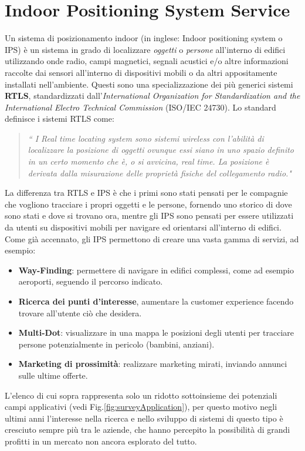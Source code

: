 \section{Indoor Positioning System Service}
\label{IPS}
Un sistema di posizionamento indoor (in inglese: Indoor positioning system o IPS) è un sistema in grado di localizzare \textit{oggetti} o \textit{persone} all'interno di edifici utilizzando onde radio, campi magnetici, segnali acustici e/o altre informazioni raccolte dai sensori all'interno di dispositivi mobili \cite{IPS} o da altri  appositamente installati nell'ambiente. Questi sono una specializzazione dei più generici sistemi \textbf{RTLS}, standardizzati dall'\textit{International
Organization for Standardization and the International Electro Technical Commission} (ISO/IEC 24730). Lo standard definisce i sistemi RTLS come:
\begin{quotation}
	\textit{“ I Real time locating system sono sistemi wireless con l'abilità di localizzare la posizione di oggetti ovunque essi siano in uno spazio definito in un certo momento che è, o si avvicina, real time. La posizione è derivata dalla misurazione delle proprietà fisiche del collegamento radio."}
\end{quotation}
La differenza tra RTLS e IPS è che i primi sono stati pensati per le compagnie che vogliono tracciare i propri oggetti e le persone, fornendo uno storico di dove sono stati e dove si trovano ora, mentre gli IPS sono pensati per essere utilizzati da utenti su dispositivi mobili per navigare ed orientarsi all'interno di edifici.
Come già accennato, gli IPS \cite{IPS2} permettono di creare una vasta gamma di servizi, ad esempio:
\begin{itemize}
	\item\textbf{Way-Finding}: permettere di navigare in edifici complessi, come ad esempio aeroporti, seguendo il percorso indicato.
	\item\textbf{Ricerca dei punti d'interesse}, aumentare la customer experience facendo trovare all’utente ciò che desidera.
	\item \textbf{Multi-Dot}: visualizzare in una mappa le posizioni degli utenti per tracciare persone potenzialmente in pericolo (bambini, anziani).
	\item \textbf{Marketing di prossimità}: realizzare marketing mirati, inviando annunci sulle ultime offerte.
\end{itemize}
L’elenco di cui sopra rappresenta solo un ridotto sottoinsieme dei potenziali campi applicativi (vedi Fig.\ref{fig:surveyApplication}), per questo motivo negli ultimi anni \cite{indoorThesis} l'interesse nella ricerca e nello sviluppo di sistemi di questo tipo è cresciuto sempre più tra le aziende, che hanno percepito la possibilità di grandi profitti in un mercato non ancora esplorato del tutto.
